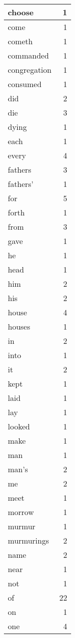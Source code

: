 \begin{center}
\begin{longtable}{l|r}
choose & 1 \\ \hline
come & 1 \\ \hline
cometh & 1 \\ \hline
commanded & 1 \\ \hline
congregation & 1 \\ \hline
consumed & 1 \\ \hline
did & 2 \\ \hline
die & 3 \\ \hline
dying & 1 \\ \hline
each & 1 \\ \hline
every & 4 \\ \hline
fathers & 3 \\ \hline
fathers' & 1 \\ \hline
for & 5 \\ \hline
forth & 1 \\ \hline
from & 3 \\ \hline
gave & 1 \\ \hline
he & 1 \\ \hline
head & 1 \\ \hline
him & 2 \\ \hline
his & 2 \\ \hline
house & 4 \\ \hline
houses & 1 \\ \hline
in & 2 \\ \hline
into & 1 \\ \hline
it & 2 \\ \hline
kept & 1 \\ \hline
laid & 1 \\ \hline
lay & 1 \\ \hline
looked & 1 \\ \hline
make & 1 \\ \hline
man & 1 \\ \hline
man's & 2 \\ \hline
me & 2 \\ \hline
meet & 1 \\ \hline
morrow & 1 \\ \hline
murmur & 1 \\ \hline
murmurings & 2 \\ \hline
name & 2 \\ \hline
near & 1 \\ \hline
not & 1 \\ \hline
of & 22 \\ \hline
on & 1 \\ \hline
one & 4 \\ \hline

\end{longtable}
\end{center}
